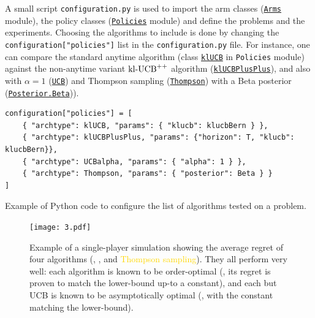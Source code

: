 A small script \texttt{configuration.py}
is used to import the arm classes (\texttt{\href{https://SMPyBandits.GitHub.io/docs/Arms.html}{Arms}} module), the policy classes (\texttt{\href{https://SMPyBandits.GitHub.io/docs/Policies.html}{Policies}} module) and define the problems and the experiments.
Choosing the algorithms to include is done by changing
the \texttt{configuration["policies"]} list in the \texttt{configuration.py} file.
For instance, one can compare the standard anytime \klUCB{} algorithm (class \texttt{\href{https://SMPyBandits.GitHub.io/docs/Policies.klUCB.html}{klUCB}} in \texttt{Policies} module) against the non-anytime variant $\mathrm{kl}\text{-}\mathrm{UCB}^{++}$ algorithm (\texttt{\href{https://SMPyBandits.GitHub.io/docs/Policies.klUCBPlusPlus.html}{klUCBPlusPlus}}), and also \UCB{} with $\alpha=1$ (\texttt{\href{https://SMPyBandits.GitHub.io/docs/Policies.UCBalpha.html}{UCB}}) and Thompson sampling (\texttt{\href{https://SMPyBandits.GitHub.io/docs/Policies.Thompson.html}{Thompson}}) with a Beta posterior (\texttt{\href{https://SMPyBandits.GitHub.io/docs/Policies.Posterior.Beta.html}{Posterior.Beta}})).

\begin{small}
\begin{listing}[h!]
    \begin{verbatim}
configuration["policies"] = [
    { "archtype": klUCB, "params": { "klucb": klucbBern } },
    { "archtype": klUCBPlusPlus, "params": {"horizon": T, "klucb": klucbBern}},
    { "archtype": UCBalpha, "params": { "alpha": 1 } },
    { "archtype": Thompson, "params": { "posterior": Beta } }
]
    \end{verbatim}
    \caption{Example of Python code to configure the list of algorithms tested on a problem.}
    \label{lst:3:howToConfigureAlgorithms}
\end{listing}
\end{small}

\begin{figure}[h!]  %
	\centering
	\texttt{[image: 3.pdf]}
	\caption[Example of a single-player simulation showing the average regret of $4$ algorithms.]{
		Example of a single-player simulation showing the average regret of four algorithms (\textcolor{red}{\UCB}, \textcolor{blue}{\KLUCBpp}, \textcolor{darkgreen}{\klUCB} and \textcolor{gold}{Thompson sampling}). They all perform very well: each algorithm is known to be order-optimal (\ie, its regret is proven to match the lower-bound up-to a constant), and each but UCB is known to be asymptotically optimal (\ie, with the constant matching the lower-bound).
	}
	\label{fig:3:firstPlot}
\end{figure}

